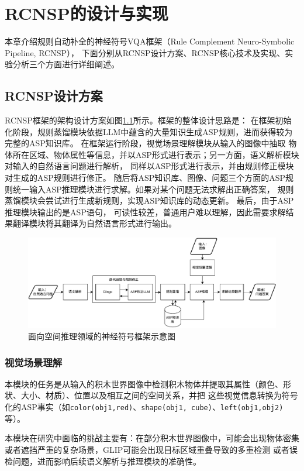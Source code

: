 \chapter{RCNSP的设计与实现}
本章介绍规则自动补全的神经符号VQA框架（Rule Complement Neuro-Symbolic Pipeline, RCNSP），
下面分别从RCNSP设计方案、RCNSP核心技术及实现、实验分析三个方面进行详细阐述。
\section{RCNSP设计方案}
RCNSP框架的架构设计方案如图\ref{fig:pipeline}所示。框架的整体设计思路是：
在框架初始化阶段，规则蒸馏模块依据LLM中蕴含的大量知识生成ASP规则，进而获得较为完整的ASP知识库。
在框架运行阶段，视觉场景理解模块从输入的图像中抽取
物体所在区域、物体属性等信息，并以ASP形式进行表示；另一方面，语义解析模块对输入的自然语言问题进行解析，
同样以ASP形式进行表示，并由规则修正模块对生成的ASP规则进行修正。
随后将ASP知识库、图像、问题三个方面的ASP规则统一输入ASP推理模块进行求解。如果对某个问题无法求解出正确答案，
规则蒸馏模块会尝试进行生成新规则，实现ASP知识库的动态更新。
最后，由于ASP推理模块输出的是ASP语句，
可读性较差，普通用户难以理解，因此需要求解结果翻译模块将其翻译为自然语言形式进行输出。
\begin{figure}[h]
    \centering
    \includegraphics[width=\textwidth]{figures/pipeline-crop.pdf}
    \caption{面向空间推理领域的神经符号框架示意图}
    \label{fig:pipeline}
\end{figure}
\subsection{视觉场景理解}
本模块的任务是从输入的积木世界图像中检测积木物体并提取其属性（颜色、形状、大小、材质）、位置以及相互之间的空间关系，并把
这些视觉信息转换为符号化的ASP事实（如\texttt{color(obj1,red)}、\texttt{shape(obj1, cube)}、\texttt{left(obj1,obj2)}等）。

本模块在研究中面临的挑战主要有：在部分积木世界图像中，可能会出现物体密集或者遮挡严重的复杂场景，GLIP可能会出现目标区域重叠导致的多重检测
或者误检问题，进而影响后续语义解析与推理模块的准确性。

